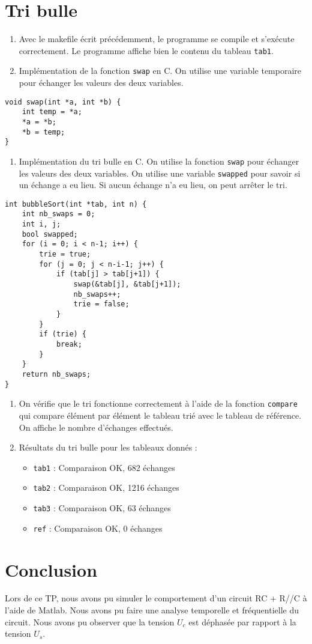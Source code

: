\documentclass[12pt]{article}
\begin{document}
\section{Tri bulle}
\begin{enumerate}
    \item Avec le makefile écrit précédemment, le programme se compile et s'exécute correctement. Le programme affiche bien le contenu du tableau \texttt{tab1}.
    \item Implémentation de la fonction \texttt{swap} en C. On utilise une variable temporaire pour échanger les valeurs des deux variables.
\end{enumerate}
    \begin{lstlisting}[style=languageC, caption=Implémentation de la fonction swap]
void swap(int *a, int *b) {
    int temp = *a;
    *a = *b;
    *b = temp;
}
    \end{lstlisting}
\begin{enumerate}[resume]
    \item Implémentation du tri bulle en C. On utilise la fonction \texttt{swap} pour échanger les valeurs des deux variables. On utilise une variable \texttt{swapped} pour savoir si un échange a eu lieu. Si aucun échange n'a eu lieu, on peut arrêter le tri.
\end{enumerate}
    \begin{lstlisting}[style=languageC, caption=Implémentation optimisée du tri bulle]
int bubbleSort(int *tab, int n) {
    int nb_swaps = 0;
    int i, j;
    bool swapped;
    for (i = 0; i < n-1; i++) {
        trie = true;
        for (j = 0; j < n-i-1; j++) {
            if (tab[j] > tab[j+1]) {
                swap(&tab[j], &tab[j+1]);
                nb_swaps++;
                trie = false;
            }
        }
        if (trie) {
            break;
        }
    }
    return nb_swaps;
}
    \end{lstlisting}
\begin{enumerate}[resume]
    \item On vérifie que le tri fonctionne correctement à l'aide de la fonction \texttt{compare} qui compare élément par élément le tableau trié avec le tableau de référence. On affiche le nombre d'échanges effectués.
    \item Résultats du tri bulle pour les tableaux donnés :
    \begin{itemize}
        \item \texttt{tab1} : Comparaison OK, 682 échanges
        \item \texttt{tab2} : Comparaison OK, 1216 échanges
        \item \texttt{tab3} : Comparaison OK, 63 échanges
        \item \texttt{ref} : Comparaison OK, 0 échanges
    \end{itemize}
\end{enumerate}

\newpage 
\section{Conclusion}
Lors de ce TP, nous avons pu simuler le comportement d'un circuit RC + R//C à l'aide de Matlab. Nous avons pu faire une analyse temporelle et fréquentielle du circuit. Nous avons pu observer que la tension $U_c$ est déphasée par rapport à la tension $U_s$.
\end{document}
